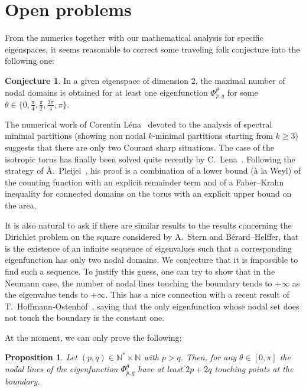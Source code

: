 \documentclass[a4paper,reqno,11pt]{amsart}
\newtheorem{prop}[thm]{Proposition}
\theoremstyle{remark}
\theoremstyle{definition}
\newtheorem{conjecture}[thm]{Conjecture}
\numberwithin{equation}{section}
\begin{document}
\newpage

\section{Open problems}
From the numerics together with our mathematical analysis for specific 
eigenspaces, it seems reasonable to correct 
some traveling folk conjecture into the following one:
\begin{conjecture}
In a given eigenspace of dimension $2$, the maximal number of nodal domains is 
obtained for at least one eigenfunction $\Phi_{p,q}^\theta$
for some $\theta \in \{0,\frac \pi 4,\frac \pi 2,\frac {3\pi}{4}, \pi\}$.
\end{conjecture}

The numerical work of Corentin L\'{e}na~\cite{Len} devoted to the analysis of spectral
minimal partitions (showing non nodal $k$-minimal partitions starting from 
$k\geq 3$) suggests that there are only two Courant sharp 
situations. The case of the isotropic torus has finally been solved quite 
recently by C.~Lena~\cite{Len2}.  Following the strategy of 
{\AA}.~Pleijel~\cite{Pl}, his proof is a combination of  a lower bound 
(\`a la Weyl) of the counting function with an explicit remainder term and of 
a Faber--Krahn inequality for connected domains on the torus with an explicit 
upper bound on the area.

It is also natural to ask if there are similar results to the results 
concerning the Dirichlet problem on the square considered by A.~Stern and 
B{\'e}rard--Helffer, that is the existence of an infinite sequence of 
eigenvalues such that a corresponding eigenfunction has only two nodal domains. 
We conjecture that it is impossible to find such a sequence. To justify this 
guess,  one can  try to show
that in the Neumann case, the number of nodal lines 
touching the boundary tends to $+\infty$ as the eigenvalue tends to 
$+\infty$.
This has a nice connection with a recent result of T.~Hoffmann-Ostenhof~\cite
{HO}, saying that the only eigenfunction whose nodal set does not touch the 
boundary is the constant one.

At the moment, we can only prove the following:
\begin{prop}
\label{prop:touchingpoints}
Let $(p,q)\in \mathbb N^*\times \mathbb N$ with $p>q$.
Then, for any $\theta\in [0,\pi]$  the nodal lines of the 
eigenfunction $\Phi^\theta_{p,q}$ have 
at least $2p + 2q$ touching points at the boundary.
\end{prop}
\end{document}
